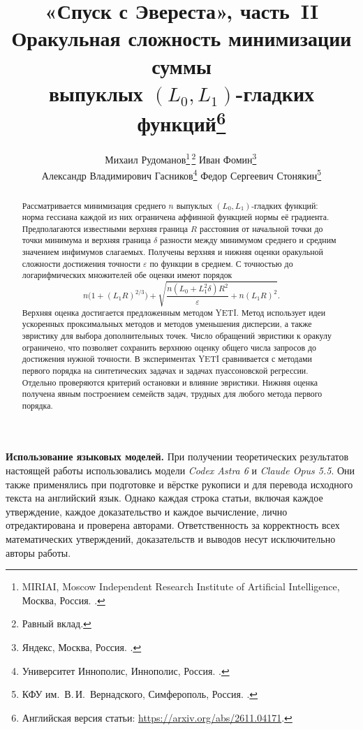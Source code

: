 \documentclass[11pt,a4paper]{article}
\title{«Спуск с Эвереста», часть~II\texorpdfstring{\\[3pt]}{: }
Оракульная сложность минимизации суммы\texorpdfstring{\\}{ }
выпуклых \texorpdfstring{$(L_0,L_1)$}{(L0,L1)}-гладких функций\texorpdfstring{\thanks{Английская версия статьи: \url{https://arxiv.org/abs/2611.04171}.}}{}}
\author{%
  Михаил Рудоманов\thanks{MIRIAI, Moscow Independent Research Institute of Artificial Intelligence, Москва, Россия. \email{rudomanov.ma@phystech.edu}.}\,\thanks{Равный вклад.}\quad
  Иван Фомин\thanks{Яндекс, Москва, Россия. \email{ash-ivanfomin@yandex-team.ru}.}\,\footnotemark[3]\\[4pt]
  Александр Владимирович Гасников\thanks{Университет Иннополис, Иннополис, Россия. \email{gasnikov@yandex.ru}.}\quad
  Федор Сергеевич Стонякин\thanks{КФУ им.~В.\,И.~Вернадского, Симферополь, Россия. \email{fedyor@mail.ru}.}}
\date{}
\begin{document}
\begingroup
\makeatletter
\renewcommand{\@fnsymbol}[1]{\ensuremath{\ifcase#1\or *\or\spadesuit\or\text{\tiny\faMountain}\or\clubsuit\or\dagger\or\ddagger\fi}}
\let\origmakefntext\@makefntext
\long\def\@makefntext#1{\rightskip\z@\@plus3em\relax\origmakefntext{#1}}
\makeatother
\maketitle
\endgroup
\begin{abstract}
Рассматривается минимизация среднего $n$ выпуклых $(L_0,L_1)$-гладких
функций: норма гессиана каждой из них ограничена аффинной функцией
нормы её градиента. Предполагаются известными верхняя граница $R$ расстояния
от начальной точки до точки минимума и верхняя граница $\delta$ разности между минимумом среднего и средним значением
инфимумов слагаемых. Получены верхняя и нижняя оценки оракульной сложности
достижения точности $\varepsilon$ по функции в среднем. С точностью до логарифмических множителей обе оценки имеют порядок
\[
 n\bigl(1+(L_1R)^{2/3}\bigr)
 +\sqrt{\frac{n(L_0+L_1^2\delta)R^2}{\varepsilon}+n(L_1R)^2}.
\]
Верхняя оценка достигается предложенным методом YETI. Метод использует
идеи ускоренных проксимальных методов и методов уменьшения дисперсии,
а также эвристику для выбора дополнительных точек.
Число обращений эвристики к оракулу ограничено, что позволяет
сохранить верхнюю оценку общего числа запросов до достижения нужной точности.
В экспериментах YETI сравнивается с методами первого порядка
на синтетических задачах и задачах пуассоновской регрессии.
Отдельно проверяются критерий остановки и влияние эвристики.
Нижняя оценка получена явным построением
семейств задач, трудных для любого метода первого порядка.
\end{abstract}

\begin{tcolorbox}[
  optimbox,
  colback=optimBlue!3!white,
  colframe=optimBlue!40!white,
  borderline west={1.4pt}{0pt}{optimBlue},
  top=7pt,bottom=7pt
]
\small
\noindent\textbf{Использование языковых моделей.}\enspace
При получении теоретических результатов настоящей работы использовались
модели \textit{Codex Astra 6} и \textit{Claude Opus 5.5}.
Они также применялись при подготовке и вёрстке рукописи и для перевода
исходного текста на английский язык.
Однако каждая строка статьи, включая каждое утверждение, каждое
доказательство и каждое вычисление, лично отредактирована и проверена
авторами. Ответственность за корректность всех математических утверждений,
доказательств и выводов несут исключительно авторы работы.
\end{tcolorbox}
\end{document}
